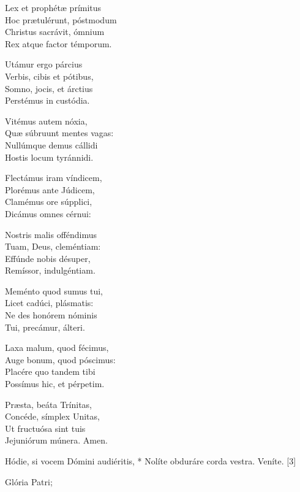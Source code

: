 Lex et prophétæ prímitus\\
Hoc prætulérunt, póstmodum\\
Christus sacrávit, ómnium\\
Rex atque factor témporum.

Utámur ergo párcius\\
Verbis, cibis et pótibus,\\
Somno, jocis, et árctius\\
Perstémus in custódia.

Vitémus autem nóxia,\\
Quæ súbruunt mentes vagas:\\
Nullúmque demus cállidi\\
Hostis locum tyránnidi.

Flectámus iram víndicem,\\
Plorémus ante Júdicem,\\
Clamémus ore súpplici,\\
Dicámus omnes cérnui:

Nostris malis offéndimus\\
Tuam, Deus, cleméntiam:\\
Effúnde nobis désuper,\\
Remíssor, indulgéntiam.

Meménto quod sumus tui,\\
Licet cadúci, plásmatis:\\
Ne des honórem nóminis\\
Tui, precámur, álteri.

Laxa malum, quod fécimus,\\
Auge bonum, quod póscimus:\\
Placére quo tandem tibi\\
Possímus hic, et pérpetim.

Præsta, beáta Trínitas,\\
Concéde, símplex Unitas,\\
Ut fructuósa sint tuis\\
Jejuniórum múnera. Amen.


 Hódie, si vocem Dómini audiéritis, * Nolíte obduráre corda vestra.  Veníte. [3]


 Glória Patri; 

